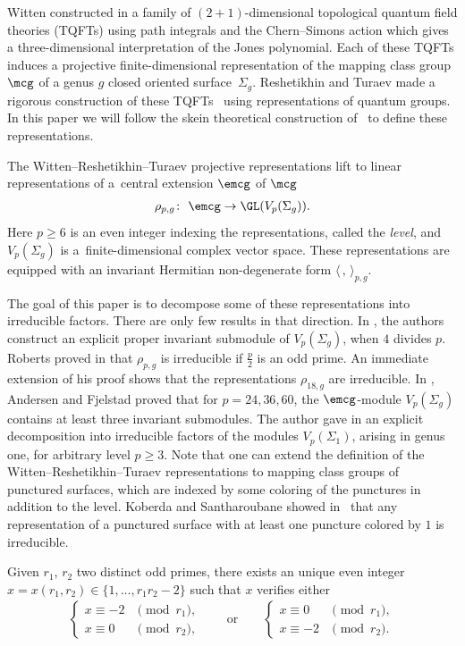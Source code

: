 Witten constructed in \cite{Wi2} a family of $(2+1)$-dimensional topological quantum field theories (TQFTs) using path integrals and the Chern--Simons action which gives a three-dimensional interpretation of the Jones polynomial. Each of these TQFTs induces a projective finite-dimensional representation of the mapping class group $\mcg$ of a genus $g$ closed oriented surface~$\Sigma_g$. Reshetikhin and Turaev made a rigorous construction of these TQFTs~\cite{RT} using representations of quantum groups. In this paper we will follow the skein theoretical construction of~\cite{BHMV2, Li2} to define these representations.

The Witten--Reshetikhin--Turaev projective representations lift to linear representations of a~central extension $\emcg$ of $\mcg$
\begin{gather*} \rho_{p,g}\colon \ \emcg \rightarrow \GL(V_p(\Sigma_g)).\end{gather*}
Here $p\geq 6$ is an even integer indexing the representations, called the \textit{level}, and $V_p(\Sigma_g)$ is a~finite-dimensional complex vector space. These representations are equipped with an invariant Hermitian non-degenerate form $\langle \, ,\, \rangle_{p,g}$.

The goal of this paper is to decompose some of these representations into irreducible factors. There are only few results in that direction. In \cite{BHMV2}, the authors construct an explicit proper invariant submodule of $V_p(\Sigma_g)$, when $4$ divides $p$. Roberts proved in \cite{Ro} that $\rho_{p,g}$ is irreducible if $\frac{p}{2}$ is an odd prime. An immediate extension of his proof shows that the representations $\rho_{18,g}$ are irreducible. In \cite{AF}, Andersen and Fjelstad proved that for $p=24,36,60$, the $\emcg$-module $V_p(\Sigma_g)$ contains at least three invariant submodules. The author gave in \cite{Koju1} an explicit decomposition into irreducible factors of the modules $V_p(\Sigma_1)$, arising in genus one, for arbitrary level $p\geq 3$. Note that one can extend the definition of the Witten--Reshetikhin--Turaev representations to mapping class groups of punctured surfaces, which are indexed by some coloring of the punctures in addition to the level. Koberda and Santharoubane showed in~\cite{KoberdaSantharoubane17} that any representation of a punctured surface with at least one puncture colored by $1$ is irreducible.

Given $r_1$, $r_2$ two distinct odd primes, there exists an unique even integer $x=x(r_1,r_2)\in \{ 1, \ldots, r_1r_2-2\}$ such that $x$ verifies either
\begin{gather*} \begin{cases}
x\equiv -2 &\pmod{r_1}, \\
x\equiv 0 & \pmod{r_2},
\end{cases} \qquad \text{or}\qquad \begin{cases}
x\equiv 0 &\pmod{r_1}, \\
x\equiv -2 & \pmod{r_2}.
\end{cases}\end{gather*}
